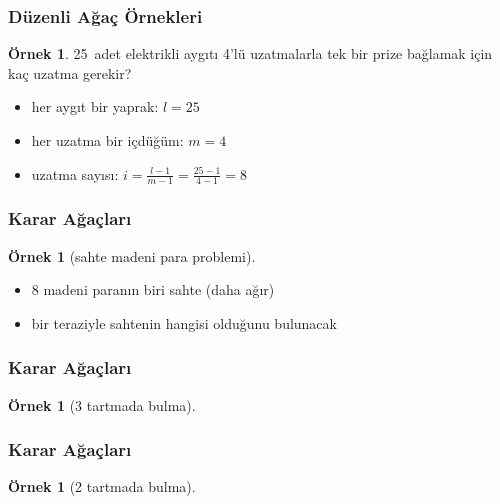 \documentclass[dvipsnames]{beamer}
\theoremstyle{definition}
\theoremstyle{example}
\newtheorem{ornek}[theorem]{Örnek}
\theoremstyle{plain}
\begin{document}
\begin{frame}
  \frametitle{Düzenli Ağaç Örnekleri}

  \begin{ornek}
    25~adet elektrikli aygıtı 4'lü uzatmalarla tek bir prize bağlamak için\\
    kaç uzatma gerekir?

    \pause
    \bigskip
    \begin{itemize}
      \item her aygıt bir yaprak: $l = 25$
      \item her uzatma bir içdüğüm: $m = 4$

      \pause
      \item uzatma sayısı: $i = \frac{l - 1}{m - 1} = \frac{25 - 1}{4 - 1} = 8$
    \end{itemize}
  \end{ornek}
\end{frame}

\begin{frame}
  \frametitle{Karar Ağaçları}

  \begin{ornek}[sahte madeni para problemi]
    \begin{itemize}
      \item 8 madeni paranın biri sahte (daha ağır)
      \item bir teraziyle sahtenin hangisi olduğunu bulunacak
    \end{itemize}
  \end{ornek}
\end{frame}

\begin{frame}
  \frametitle{Karar Ağaçları}

  \begin{ornek}[3 tartmada bulma]
    \begin{center}
    \end{center}
  \end{ornek}
\end{frame}

\begin{frame}
  \frametitle{Karar Ağaçları}

  \begin{ornek}[2 tartmada bulma]
    \begin{center}
    \end{center}
  \end{ornek}
\end{frame}
\end{document}
